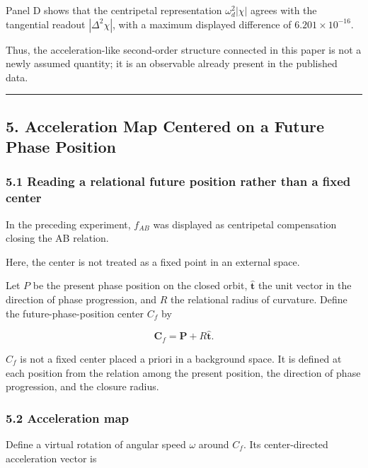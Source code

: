 \documentclass[
  a4paper,
]{article}
\begin{document}
Panel D shows that the centripetal representation \(\omega_d^2|\chi|\)
agrees with the tangential readout \(|\Delta^2\chi|\), with a maximum
displayed difference of \(6.201\times10^{-16}\).

Thus, the acceleration-like second-order structure connected in this
paper is not a newly assumed quantity; it is an observable already
present in the published data.

\begin{center}\rule{0.5\linewidth}{0.5pt}\end{center}

\subsection{5. Acceleration Map Centered on a Future Phase
Position}\label{acceleration-map-centered-on-a-future-phase-position}

\subsubsection{5.1 Reading a relational future position rather than a
fixed
center}\label{reading-a-relational-future-position-rather-than-a-fixed-center}

In the preceding experiment, \(f_{AB}\) was displayed as centripetal
compensation closing the AB relation.

Here, the center is not treated as a fixed point in an external space.

Let \(P\) be the present phase position on the closed orbit,
\(\hat{\boldsymbol t}\) the unit vector in the direction of phase
progression, and \(R\) the relational radius of curvature. Define the
future-phase-position center \(C_f\) by

\[
\boldsymbol C_f
=\boldsymbol P+R\hat{\boldsymbol t}.
\]

\(C_f\) is not a fixed center placed a priori in a background space. It
is defined at each position from the relation among the present
position, the direction of phase progression, and the closure radius.

\subsubsection{5.2 Acceleration map}\label{acceleration-map}

Define a virtual rotation of angular speed \(\omega\) around \(C_f\).
Its center-directed acceleration vector is
\end{document}
